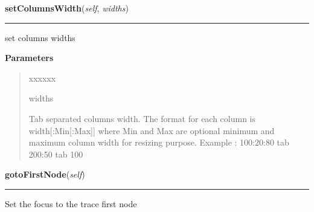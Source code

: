     \label{tracetool:WinTrace:setColumnsWidth}

    \vspace{0.5ex}

\hspace{.8\funcindent}\begin{boxedminipage}{\funcwidth}

    \raggedright \textbf{setColumnsWidth}(\textit{self}, \textit{widths})

    \vspace{-1.5ex}

    \rule{\textwidth}{0.5\fboxrule}
\setlength{\parskip}{2ex}
    set columns widths

\setlength{\parskip}{1ex}
      \textbf{Parameters}
      \vspace{-1ex}

      \begin{quote}
        \begin{Ventry}{xxxxxx}

          \item[widths]

          Tab separated columns width. The format for each column is 
          width[:Min[:Max]] where Min and Max are optional minimum and 
          maximum column width for resizing purpose. Example : 100:20:80 
          tab 200:50 tab 100

        \end{Ventry}

      \end{quote}

    \end{boxedminipage}

    \label{tracetool:WinTrace:gotoFirstNode}

    \vspace{0.5ex}

\hspace{.8\funcindent}\begin{boxedminipage}{\funcwidth}

    \raggedright \textbf{gotoFirstNode}(\textit{self})

    \vspace{-1.5ex}

    \rule{\textwidth}{0.5\fboxrule}
\setlength{\parskip}{2ex}
    Set the focus to the trace first node

\setlength{\parskip}{1ex}
    \end{boxedminipage}

